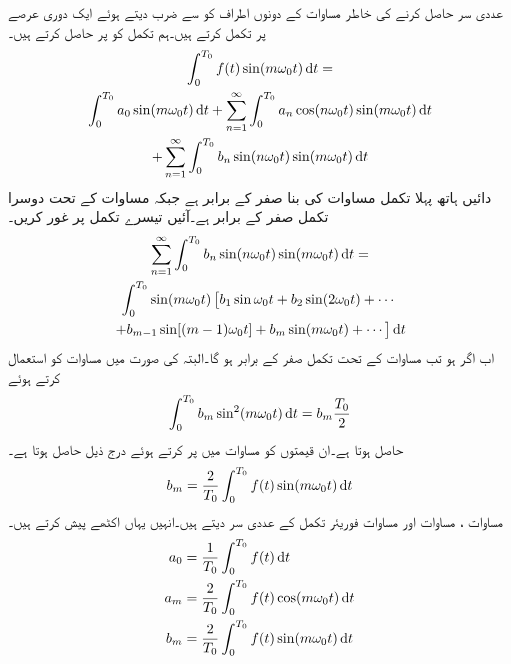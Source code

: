 عددی سر  حاصل کرنے کی خاطر مساوات  کے دونوں اطراف کو  سے ضرب دیتے ہوئے ایک دوری عرصے پر تکمل کرتے ہیں۔ہم تکمل کو  پر حاصل کرتے ہیں۔
\begin{multline}\label{مساوات_فوریئر_عددی_سر_کا_حصول_ب}
\int_0^{T_0}f(t) \sin (m \omega_0 t) \dif t=\\
\int_0^{T_0} a_0 \sin (m\omega_0 t) \dif t+\sum_{n=1}^{\infty}  \int_0^{T_0} a_n\cos (n \omega_0 t)  \sin (m \omega_0 t) \dif t \\
+\sum_{n=1}^{\infty} \int_0^{T_0} b_n \sin (n \omega_0 t) \sin (m\omega_0 t) \dif t
\end{multline}
دائیں ہاتھ پہلا تکمل مساوات  کی بنا صفر کے برابر ہے جبکہ مساوات  کے تحت دوسرا تکمل صفر کے برابر ہے۔آئیں تیسرے تکمل پر غور کریں۔
\begin{multline*}
\sum_{n=1}^{\infty} \int_0^{T_0} b_n \sin (n \omega_0 t) \sin (m\omega_0 t) \dif t=\\
\int_0^{T_0} \sin (m\omega_0 t)\left[b_1 \sin \omega_0 t+b_2\sin (2\omega_0 t)+\cdots \right.\\
\left.+b_{m-1}\sin[(m-1)\omega_0 t]+b_m\sin(m\omega_0 t)+\cdots \right] \dif t
\end{multline*}
اب اگر  ہو تب مساوات  کے تحت تکمل صفر کے برابر ہو گا۔البتہ  کی صورت میں مساوات  کو استعمال کرتے ہوئے
\begin{align*}
\int_0^{T_0}b_m \sin^2 (m\omega_0 t) \dif t=b_m\frac{T_0}{2}
\end{align*} 
حاصل ہوتا ہے۔ان قیمتوں کو مساوات  میں پر کرتے ہوئے درج ذیل حاصل ہوتا ہے۔
\begin{align}\label{مساوات_فوریئر_عددی_سر_پ}
b_m=\frac{2}{T_0}\int_0^{T_0}f(t) \sin (m \omega_0 t) \dif t
\end{align}
مساوات ، مساوات  اور مساوات  فوریئر تکمل کے عددی سر دیتے ہیں۔انہیں یہاں اکٹھے پیش کرتے ہیں۔
\begin{gather}
\begin{aligned}\label{مساوات_فوریئر_عددی_سر_ت}
a_0&=\frac{1}{T_0}\int_0^{T_0}f(t) \dif t\\
a_m&=\frac{2}{T_0}\int_0^{T_0}f(t) \cos (m \omega_0 t) \dif t\\
b_m&=\frac{2}{T_0}\int_0^{T_0}f(t) \sin (m \omega_0 t) \dif t
\end{aligned}
\end{gather}


